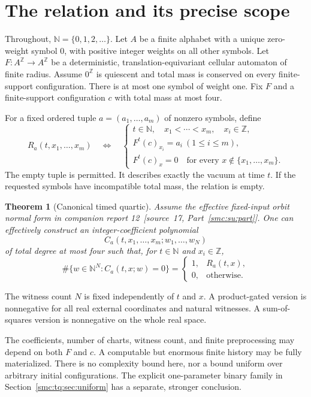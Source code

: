 \documentclass[11pt,letterpaper]{article}
\numberwithin{equation}{section}
\newtheorem{theorem}{Theorem}[section]
\theoremstyle{definition}
\theoremstyle{remark}
\newcommand{\Z}{\mathbb Z}
\newcommand{\NN}{\mathbb N}
\begin{document}
\section{The relation and its precise scope}\label{smc:tq:sec:relation}
Throughout, $\NN=\{0,1,2,\ldots\}$. Let $A$ be a finite alphabet with a
unique zero-weight symbol $0$, with positive integer weights on all other
symbols. Let $F:A^{\Z}\to A^{\Z}$ be a deterministic, translation-equivariant
cellular automaton of finite radius. Assume $0^{\Z}$ is quiescent and total
mass is conserved on every finite-support configuration. There is at most
one symbol of weight one. Fix $F$ and a finite-support configuration $c$
with total mass at most four.

For a fixed ordered tuple $a=(a_1,\ldots,a_m)$ of nonzero symbols, define
\[
 R_a(t,x_1,\ldots,x_m)\quad\Longleftrightarrow\quad
 \begin{cases}
 t\in\NN,\quad x_1<\cdots<x_m,\quad x_i\in\Z,\\
 F^t(c)_{x_i}=a_i\ (1\le i\le m),\\
 F^t(c)_x=0\quad\text{for every }x\notin\{x_1,\ldots,x_m\}.
 \end{cases}
\]
The empty tuple is permitted. It describes exactly the vacuum at time $t$.
If the requested symbols have incompatible total mass, the relation is empty.

\begin{theorem}[Canonical timed quartic]\label{smc:tq:thm:main}
Assume the effective fixed-input orbit normal form in companion report
12~\textup{[source~17, Part~\ref{smc:su:part}]}. One can effectively construct an integer-coefficient
polynomial
\[
 C_a(t,x_1,\ldots,x_m;w_1,\ldots,w_N)
\]
of total degree at most four such that, for $t\in\NN$ and $x_i\in\Z$,
\[
 \#\{w\in\NN^N:C_a(t,x;w)=0\}
 =\begin{cases}1,&R_a(t,x),\\0,&\text{otherwise}.\end{cases}
\]
\end{theorem}

The witness count $N$ is fixed independently of $t$ and $x$. A product-gated
version is nonnegative for all real external coordinates and natural
witnesses. A sum-of-squares version is nonnegative on the whole real space.

The coefficients, number of charts, witness count, and finite preprocessing
may depend on both $F$ and $c$. A computable but enormous finite history may
be fully materialized. There is no complexity bound here, nor a bound uniform
over arbitrary initial configurations. The explicit one-parameter binary
family in Section~\ref{smc:tq:sec:uniform} has a separate, stronger conclusion.
\end{document}
